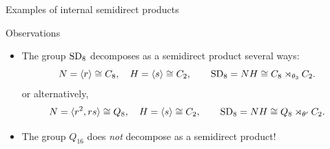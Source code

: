 \documentclass[8pt, handout]{beamer}
\newcommand{\Pause}{}      %
\begin{document}
\begin{frame}{Examples of internal semidirect products}
  \vspace{-2mm}\Pause
  
  \begin{exampleblock}{Observations}
    \begin{itemize}
    \item The group $\operatorname{SD}_8$ decomposes as a semidirect product several ways:
      \[
      N=\langle r\rangle\cong C_8,\quad H=\langle s\rangle\cong C_2,\qquad \operatorname{SD}_8=NH\cong
      C_8\rtimes_{\theta_3}C_2.
      \]
      \Pause or alternatively,
      \[
      N=\langle r^2,rs\rangle\cong Q_8,\quad H=\langle s\rangle\cong C_2,\qquad \operatorname{SD}_8=NH\cong
      Q_8\rtimes_{\theta'}C_2.
      \] \Pause
    \item \vspace{-2mm} The group $Q_{16}$ does \emph{not} decompose
      as a semidirect product!
    \end{itemize}
  \end{exampleblock}
  
\end{frame}

\end{document}
